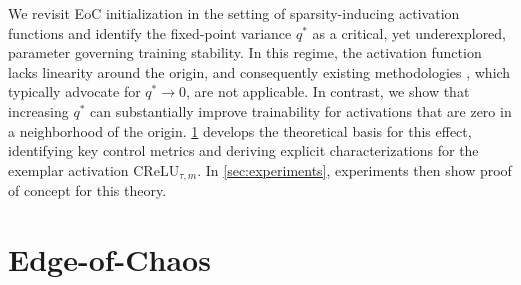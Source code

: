 \documentclass{article}
\theoremstyle{plain}
\theoremstyle{definition}
\theoremstyle{remark}
\begin{document}
We revisit EoC initialization in the setting of sparsity-inducing activation functions and identify the fixed-point variance $q^*$ as a critical, yet underexplored, parameter governing training stability. In this regime, the activation function lacks linearity around the origin, and consequently existing methodologies \cite{martens_rapid_2021, roberts_principles_2022, murray_activation_2022}, which typically advocate for $q^*\rightarrow0$, are not applicable. In contrast, we show that increasing $q^*$ can substantially improve trainability for activations that are zero in a neighborhood of the origin.
\cref{sec:eoc_theory} develops the theoretical basis for this effect, identifying key control metrics and deriving explicit characterizations for the exemplar activation $\text{CReLU}_{\tau, m}$. In \cref{sec:experiments}, experiments then show proof of concept for this theory.

\section{Edge-of-Chaos}\label{sec:eoc_theory}
\end{document}
